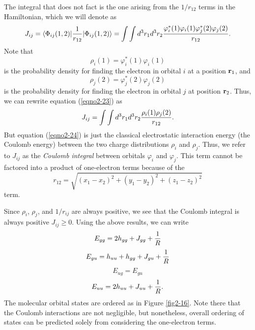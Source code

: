 The integral that does not fact is the one arising from the $1/r_{12}$ terms
in the Hamiltonian, which we will denote as
\begin{equation}
J_{ij} = \langle \Phi_{ij} ( 1 , 2 ) \vert {1 \over r_{12}} \vert 
\Phi_{ij} ( 1 , 2 ) \rangle = \int \int d^3 r_1 d^3 r_2 
{\varphi^*_i ( 1 ) \varphi_i ( 1 ) \varphi^*_j ( 2 ) \varphi_j ( 
2 ) \over r_{12}}.
\label{eqno2-23}
\end{equation}
Note that
\begin{equation}
\rho_i ( 1 ) = \varphi^*_i ( 1 ) \varphi_i ( 1 )
\end{equation}
is the probability density for finding the electron in orbital $i$ 
at a position ${\bf r}_1$, and
\begin{equation}
\rho_j ( 2 ) = \varphi^*_j ( 2 ) \varphi_j ( 2 )
\end{equation}
is the probability density for finding the electron in orbital $j$ at
position ${\bf r}_2$.  Thus, we can rewrite equation (\ref{eqno2-23})
as
\begin{equation}
J_{ij} = \int \int d^3 r_1 d^3 r_2 {\rho_i ( 1 ) \rho_j ( 2 ) \over 
r_{12}}.
\label{eqno2-24}
\end{equation}
But equation (\ref{eqno2-24}) is just the classical electrostatic
interaction energy (the Coulomb energy) between the two charge
distributions $\rho_i$ and $\rho_j$. Thus, we refer to $J_{ij}$ as the
\emph{Coulomb integral} between orbitals $\varphi_i$ and
$\varphi_j$. This term cannot be factored into a product of
one-electron terms because of the
\begin{equation}
r_{12} = \sqrt{( x_1 - x_2 )^2 + (y_1 - y_2 )^2 + ( z_1 - z_2 )^2}
\end{equation}
term.

Since $\rho_i$, $\rho_j$, and $1/r_{ij}$ are always positive, we see 
that the Coulomb integral is always positive $J_{ij} \geq 0$. Using the 
above results, we can write
\begin{equation}
E_{gg} = 2 h_{gg} + J_{gg} + {1 \over R}
\label{eqno2-25}
\end{equation}
\begin{equation}
E_{gu} = h_{uu} + h_{gg} + J_{gu} + {1 \over R}
\label{eqno2-26}
\end{equation}
\begin{equation}
E_{ug} = E_{gu}
\end{equation}
\begin{equation}
E_{uu}  = 2 h_{uu} + J_{uu} + {1 \over R}.
\end{equation}
The molecular orbital states are ordered as in Figure
\ref{fig2-16}. Note there that the Coulomb interactions are not
negligible, but nonetheless, overall ordering of states can be
predicted solely from considering the one-electron terms.

